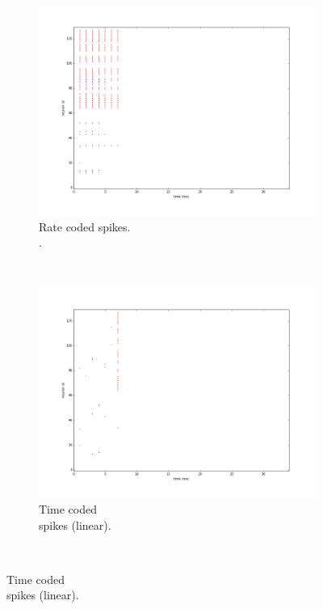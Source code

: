 \documentclass[twocolumn, a4paper]{article}
\begin{document}
\begin{figure}[htb]
  \captionsetup[subfigure]{justification=centering}
  
  \centering
  \begin{subfigure}[b]{0.25\textwidth}
    \includegraphics[width=\textwidth]{rate_coded_-8x8-_cycle_0}
    \caption{Rate coded spikes.\\ .}
    \label{fig:rate_spikes}
  \end{subfigure}~
  \begin{subfigure}[b]{0.25\textwidth}
    \includegraphics[width=\textwidth]{time_coded_-8x8-_cycle_0}
    \caption{Time coded\\spikes (linear).}
    \label{fig:time_spikes}
  \end{subfigure}\\

\end{figure}
\end{document}
